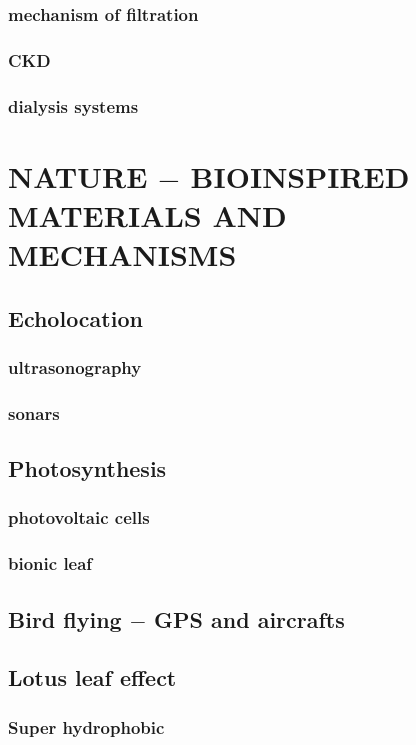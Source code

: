 \documentclass{article}
\begin{document}
	\subsubsection{mechanism of filtration}
	\subsubsection{CKD}
	\subsubsection{dialysis systems}
	\newpage

	\section{NATURE $-$ BIOINSPIRED MATERIALS AND MECHANISMS}
	\subsection{Echolocation}
	\subsubsection{ultrasonography}
	\subsubsection{sonars}

	\subsection{Photosynthesis}
	\subsubsection{photovoltaic cells}
	\subsubsection{bionic leaf}

	\subsection{Bird flying $-$ GPS and aircrafts}
	
	\subsection{Lotus leaf effect}
	\subsubsection{Super hydrophobic}
\end{document}
